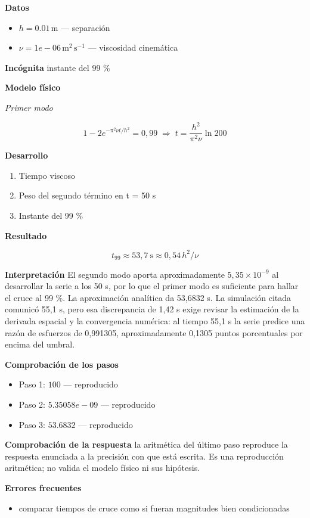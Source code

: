 \documentclass[10pt,openany]{book}
\begin{document}
\noindent\textbf{Datos}
\begin{itemize}
\item $h = 0.01\,\mathrm{m}$ — separación
\item $\nu = 1e-06\,\mathrm{m}^{2}\,\mathrm{s}^{-1}$ — viscosidad cinemática
\end{itemize}

\noindent\textbf{Incógnita}
instante del 99 \%

\noindent\textbf{Modelo físico}

\noindent\textit{Primer modo}

\[
1 - 2e^{-\pi^{2}\nu t/h^{2}} = 0{,}99 \;\Rightarrow\; t = \frac{h^{2}}{\pi^{2}\nu}\ln 200
\]

\noindent\textbf{Desarrollo}
\begin{enumerate}
\item
Tiempo viscoso
\item
Peso del segundo término en t = 50 s
\item
Instante del 99 \%
\end{enumerate}

\noindent\textbf{Resultado}

\[
t_{99} \approx 53{,}7\ \mathrm{s} \approx 0{,}54\,h^{2}/\nu
\]

\noindent\textbf{Interpretación}
El segundo modo aporta aproximadamente \(5{,}35\times10^{-9}\) al desarrollar la serie a los 50 s, por lo que el primer modo es suficiente para hallar el cruce al 99 \%. La aproximación analítica da 53,6832 s. La simulación citada comunicó 55,1 s, pero esa discrepancia de 1,42 s exige revisar la estimación de la derivada espacial y la convergencia numérica: al tiempo 55,1 s la serie predice una razón de esfuerzos de 0,991305, aproximadamente 0,1305 puntos porcentuales por encima del umbral.

\noindent\textbf{Comprobación de los pasos}
\begin{itemize}
\item Paso 1: $100$ — reproducido
\item Paso 2: $5.35058e-09$ — reproducido
\item Paso 3: $53.6832$ — reproducido
\end{itemize}

\noindent\textbf{Comprobación de la respuesta} la aritmética del último paso reproduce la respuesta enunciada a la precisión con que está escrita. Es una reproducción aritmética; no valida el modelo físico ni sus hipótesis.

\noindent\textbf{Errores frecuentes}
\begin{itemize}
\item comparar tiempos de cruce como si fueran magnitudes bien condicionadas
\end{itemize}
\end{document}
